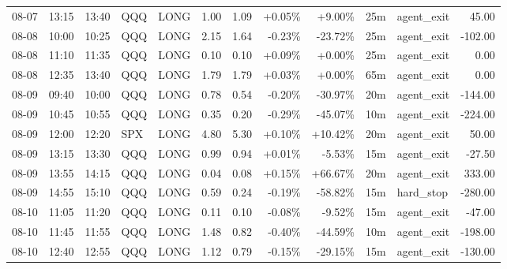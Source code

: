 \documentclass[11pt,a4paper]{article}
\begin{document}
\begin{center}
\begin{longtable}{>{\color{txtmain}}l l l l l r r r r r >{\color{txtmain}}l r}
08-07 & 13:15 & 13:40 & QQQ & LONG & 1.00 & 1.09 & \textcolor{wingreen}{+0.05\%} & \textcolor{wingreen}{+9.00\%} & 25m & agent\_exit & \textcolor{wingreen}{45.00} \\
08-08 & 10:00 & 10:25 & QQQ & LONG & 2.15 & 1.64 & \textcolor{lossred}{-0.23\%} & \textcolor{lossred}{-23.72\%} & 25m & agent\_exit & \textcolor{lossred}{-102.00} \\
08-08 & 11:10 & 11:35 & QQQ & LONG & 0.10 & 0.10 & \textcolor{wingreen}{+0.09\%} & \textcolor{wingreen}{+0.00\%} & 25m & agent\_exit & \textcolor{wingreen}{0.00} \\
08-08 & 12:35 & 13:40 & QQQ & LONG & 1.79 & 1.79 & \textcolor{wingreen}{+0.03\%} & \textcolor{wingreen}{+0.00\%} & 65m & agent\_exit & \textcolor{wingreen}{0.00} \\
08-09 & 09:40 & 10:00 & QQQ & LONG & 0.78 & 0.54 & \textcolor{lossred}{-0.20\%} & \textcolor{lossred}{-30.97\%} & 20m & agent\_exit & \textcolor{lossred}{-144.00} \\
08-09 & 10:45 & 10:55 & QQQ & LONG & 0.35 & 0.20 & \textcolor{lossred}{-0.29\%} & \textcolor{lossred}{-45.07\%} & 10m & agent\_exit & \textcolor{lossred}{-224.00} \\
08-09 & 12:00 & 12:20 & SPX & LONG & 4.80 & 5.30 & \textcolor{wingreen}{+0.10\%} & \textcolor{wingreen}{+10.42\%} & 20m & agent\_exit & \textcolor{wingreen}{50.00} \\
08-09 & 13:15 & 13:30 & QQQ & LONG & 0.99 & 0.94 & \textcolor{wingreen}{+0.01\%} & \textcolor{lossred}{-5.53\%} & 15m & agent\_exit & \textcolor{lossred}{-27.50} \\
08-09 & 13:55 & 14:15 & QQQ & LONG & 0.04 & 0.08 & \textcolor{wingreen}{+0.15\%} & \textcolor{wingreen}{+66.67\%} & 20m & agent\_exit & \textcolor{wingreen}{333.00} \\
08-09 & 14:55 & 15:10 & QQQ & LONG & 0.59 & 0.24 & \textcolor{lossred}{-0.19\%} & \textcolor{lossred}{-58.82\%} & 15m & hard\_stop & \textcolor{lossred}{-280.00} \\
08-10 & 11:05 & 11:20 & QQQ & LONG & 0.11 & 0.10 & \textcolor{lossred}{-0.08\%} & \textcolor{lossred}{-9.52\%} & 15m & agent\_exit & \textcolor{lossred}{-47.00} \\
08-10 & 11:45 & 11:55 & QQQ & LONG & 1.48 & 0.82 & \textcolor{lossred}{-0.40\%} & \textcolor{lossred}{-44.59\%} & 10m & agent\_exit & \textcolor{lossred}{-198.00} \\
08-10 & 12:40 & 12:55 & QQQ & LONG & 1.12 & 0.79 & \textcolor{lossred}{-0.15\%} & \textcolor{lossred}{-29.15\%} & 15m & agent\_exit & \textcolor{lossred}{-130.00} \\

\end{longtable}
\end{center}
\end{document}
